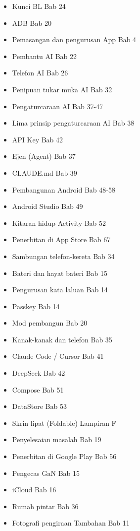 


\begin{itemize}
  \item Kunci BL Bab 24
  \item ADB Bab 20
  \item Pemasangan dan pengurusan App Bab 4
  \item Pembantu AI Bab 22
  \item Telefon AI Bab 26
  \item Penipuan tukar muka AI Bab 32
  \item Pengaturcaraan AI Bab 37-47
  \item Lima prinsip pengaturcaraan AI Bab 38
  \item API Key Bab 42
  \item Ejen (Agent) Bab 37
  \item CLAUDE.md Bab 39
  \item Pembangunan Android Bab 48-58
  \item Android Studio Bab 49
  \item Kitaran hidup Activity Bab 52
  \item Penerbitan di App Store Bab 67
\end{itemize}


\begin{itemize}
  \item Sambungan telefon-kereta Bab 34
  \item Bateri dan hayat bateri Bab 15
  \item Pengurusan kata laluan Bab 14
  \item Passkey Bab 14
  \item Mod pembangun Bab 20
  \item Kanak-kanak dan telefon Bab 35
  \item Claude Code / Cursor Bab 41
  \item DeepSeek Bab 42
  \item Compose Bab 51
  \item DataStore Bab 53
\end{itemize}


\begin{itemize}
  \item Skrin lipat (Foldable) Lampiran F
  \item Penyelesaian masalah Bab 19
  \item Penerbitan di Google Play Bab 56
  \item Pengecas GaN Bab 15
  \item iCloud Bab 16
  \item Rumah pintar Bab 36
  \item Fotografi pengiraan Tambahan Bab 11
\end{itemize}

